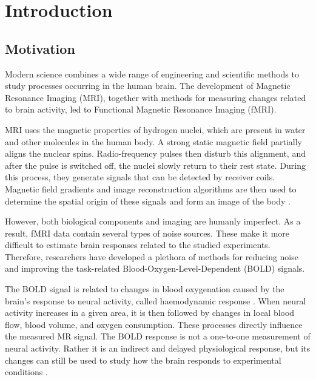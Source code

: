 \documentclass[english]{pwr_wmat_praca_dyplomowa}
\theoremstyle{definition}
\theoremstyle{remark}
\begin{document}
\frontmatter
\maketitle
\mainmatter
\tableofcontents


\chapter{Introduction}

\section{Motivation}

Modern science combines a wide range of engineering and scientific methods to study processes occurring in the human brain. The development of Magnetic Resonance Imaging (MRI), together with methods for measuring changes related to brain activity, led to Functional Magnetic Resonance Imaging (fMRI).

MRI uses the magnetic properties of hydrogen nuclei, which are present in water and other molecules in the human body. A strong static magnetic field partially aligns the nuclear spins. Radio-frequency pulses then disturb this alignment, and after the pulse is switched off, the nuclei slowly return to their rest state. During this process, they generate signals that can be detected by receiver coils. Magnetic field gradients and image reconstruction algorithms are then used to determine the spatial origin of these signals and form an image of the body \cite{fmri}.

However, both biological components and imaging are humanly imperfect. As a result, fMRI data contain several types of noise sources. These make it more difficult to estimate brain responses related to the studied experiments. Therefore, researchers have developed a plethora of methods for reducing noise and improving the task-related Blood-Oxygen-Level-Dependent (BOLD) signals. 

The BOLD signal is related to changes in blood oxygenation caused by the brain's response to neural activity, called haemodynamic response \cite{fmri}. When neural activity increases in a given area, it is then followed by changes in local blood flow, blood volume, and oxygen consumption. These processes directly influence the measured MR signal. The BOLD response is not a one-to-one measurement of neural activity. Rather it is an indirect and delayed physiological response, but its changes can still be used to study how the brain responds to experimental conditions \cite{bold-response, fmri}.
\end{document}
